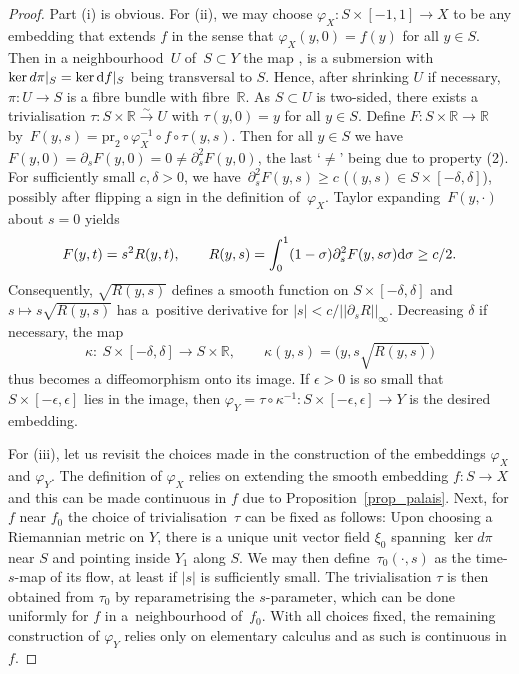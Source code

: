 \documentclass[10pt,a4paper]{amsart}
\numberwithin{equation}{section}
\theoremstyle{definition}
\newcommand{\R}{\mathbb{R}} %
\newcommand{\1}{{\bf 1}}
\begin{document}
\begin{proof}
Part (i) is obvious. For (ii), we may choose $\varphi_X\colon S\times [-1,1]\to X$ to be any embedding that extends $f$ in the sense that $\varphi_X(y,0)=f(y)$ for all $y\in S$.
Then in a neighbourhood~$U$ of~${S\subset Y}$ the map
,
is a submersion with $\ker d\pi|_S = \ker {\rm d}f|_S$ being transversal to $S$. Hence, after shrinking $U$ if necessary, $\pi\colon U\to S$ is a fibre bundle with fibre~$\R$. As $S\subset U$ is two-sided, there exists a trivialisation
$\tau\colon S\times \R \xrightarrow{\sim} U$
with $\tau(y,0)=y$ for all $y\in S$. Define $F\colon S\times \R\to \R$ by~${F(y,s) = \mathrm{pr}_2\circ \varphi_X^{-1}\circ f\circ\tau(y,s)}$. Then for all $y\in S$ we have~$F(y,0) = \partial_s F(y,0)=0 \neq \partial_s^2 F(y,0)$, the last `$\neq$' being due to property (2). For sufficiently small $c,\delta>0$, we have~$
	\partial_s^2 F(y,s) \ge c$ ($(y,s)\in S\times [-\delta,\delta]$),
possibly after flipping a sign in the definition of~$\varphi_X$.
Taylor expanding~$F(y,\cdot)$ about $s=0$ yields
\[
	F(y,t) = s^2 R(y,t),\qquad R(y,s) = \int_0^1(1-\sigma) \partial_{s}^2F(y,s\sigma) {\rm d}\sigma \ge c/2.
\]
Consequently, $\sqrt{R(y,s)}$ defines a smooth function on $S\times [-\delta,\delta]$ and $s\mapsto s \sqrt{R(y,s)}$ has a~positive derivative for $|s| < c/||\partial_s R||_{\infty}$. Decreasing $\delta$ if necessary, the map
\[
\kappa\colon\ S\times [-\delta,\delta]\to S\times \R,\qquad \kappa(y,s) = \bigl(y, s \sqrt{R(y,s)} \bigr)
\] thus becomes a diffeomorphism onto its image. If $\epsilon>0$ is so small that $S\times [-\epsilon,\epsilon]$ lies in the image, then $\varphi_Y = \tau\circ \kappa^{-1}\colon S\times [-\epsilon,\epsilon]\to Y$ is the desired embedding.

For (iii), let us revisit the choices made in the construction of the embeddings $\varphi_X$ and $\varphi_Y$. The definition of $\varphi_X$ relies on extending the smooth embedding $f\colon S\to X$ and this can be made continuous in $f$ due to Proposition~\ref{prop_palais}. Next, for $f$ near $f_0$ the choice of trivialisation~$\tau$
can be fixed as follows: Upon choosing a Riemannian metric on $Y$, there is a unique unit vector field $\xi_0$ spanning $\ker d\pi$ near $S$ and pointing inside $Y_1$ along $S$. We may then define~$\tau_0(\cdot,s)$ as the time-$s$-map of its flow, at least if $|s|$ is sufficiently small. The trivialisation $\tau$ is then obtained from $\tau_0$ by reparametrising the $s$-parameter, which can be done uniformly for $f$ in a~neighbourhood of~$f_0$. With all choices fixed, the remaining construction of $\varphi_Y$ relies only on elementary calculus and as such is continuous in $f$.


\end{proof}
\end{document}
